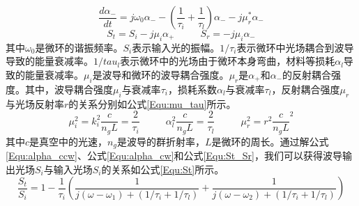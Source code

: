 \begin{equation}
\label{Equ:alpha_cw}
\frac{d\alpha_-}{dt}=j\omega_0\alpha_--\left(\frac{1}{\tau_i}+\frac{1}{\tau_l}\right)\alpha_--j\mu_r^*\alpha_-
\end{equation}
\begin{equation}
\label{Equ:St_Sr}
S_t = S_i-j\mu_i\alpha_+ ~~~~~~~~~~~~ S_r = -j\mu_i\alpha_-
\end{equation}
其中$\omega_0$是微环的谐振频率。$S_i$表示输入光的振幅。$1/\tau_i$表示微环中光场耦合到波导导致的能量衰减率。$1/tau_l$表示微环中的光场由于微环本身弯曲，材料等损耗$\alpha_l$导致的能量衰减率。$\mu_i$是波导和微环的波导耦合强度。$\mu_r$是$\alpha_+$和$\alpha_-$的反射耦合强度。其中，波导耦合强度$\mu_i$与衰减率$\tau_i$，损耗系数$\alpha_l$与衰减率$\tau_l$，反射耦合强度$\mu_r$与光场反射率$r$的关系分别如公式\ref{Equ:mu_tau}所示\cite{little1997microring}。
\begin{equation}
\label{Equ:mu_tau}
\mu_i^2=k_i^2\frac{c}{n_gL}=\frac{2}{\tau_i}~~~~~~~~~~~~\alpha_l^2\frac{c}{n_gL}=\frac{2}{\tau_l}~~~~~~~~~~~~\mu_r^2=r^2\frac{c}{n_gL}^2
\end{equation}
其中$c$是真空中的光速，$n_g$是波导的群折射率，$L$是微环的周长。通过解公式\ref{Equ:alpha_ccw}、公式\ref{Equ:alpha_cw}和公式\ref{Equ:St_Sr}，我们可以获得波导输出光场$S_i$与输入光场$S_i$的关系如公式\ref{Equ:St}所示。
\begin{equation}
\label{Equ:St}
\frac{S_t}{S_i}=1-\frac{1}{\tau_i}\left(\frac{1}{j(\omega-\omega_1)+(1/\tau_i+1/\tau_l)} + \frac{1}{j(\omega-\omega_2)+(1/\tau_i+1/\tau_l)}\right)
\end{equation}

